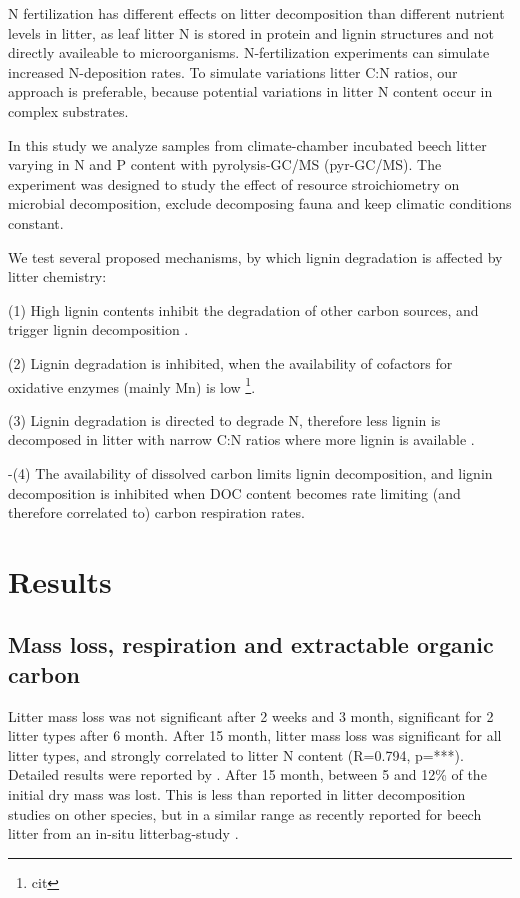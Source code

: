 \documentclass[10pt]{article}
\begin{document}
N fertilization has different effects on litter decomposition than different nutrient levels in litter, as leaf litter N is stored in protein and lignin structures and not directly availeable to microorganisms. N-fertilization experiments can simulate increased N-deposition rates. To simulate variations litter C:N ratios, our approach is preferable, because potential variations in litter N content occur in complex substrates.

In this study we analyze samples from climate-chamber incubated beech litter varying in N and P content with pyrolysis-GC/MS (pyr-GC/MS). The experiment was designed to study the effect of resource stroichiometry on microbial decomposition, exclude decomposing fauna and keep climatic conditions constant.

We test several proposed mechanisms, by which lignin degradation is affected by litter chemistry:

(1) High lignin contents inhibit the degradation of other carbon sources, and trigger lignin decomposition \cite{Berg1980}.

(2) Lignin degradation is inhibited, when the availability of cofactors for oxidative enzymes (mainly Mn) is low \footnote{cit}.

(3) Lignin degradation is directed to degrade N, therefore less lignin is decomposed in litter with narrow C:N ratios where more lignin is available \cite{Craine2007}.

-(4) The availability of dissolved carbon limits lignin decomposition, and lignin decomposition is inhibited when DOC content becomes rate limiting (and therefore correlated to) carbon respiration rates\cite{Klotzbucher2011}.


\section*{Results}

\subsection*{Mass loss, respiration and extractable organic carbon}

Litter mass loss was not significant after 2 weeks and 3 month, significant for 2 litter types after 6 month. After 15 month, litter mass loss was significant for all litter types, and strongly correlated to litter N content (R=0.794, p=***). Detailed results were reported by \cite{Mooshammer2011}. After 15 month, between 5 and 12\% of the initial dry mass was lost. This is less than reported in litter decomposition studies on other species, but in a similar range as recently reported for beech litter from an in-situ litterbag-study \cite{Kalbitz2006} .
\end{document}
